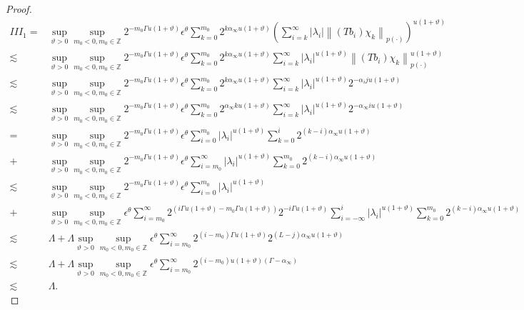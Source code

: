 \documentclass[oneside,reqno]{amsart}
\numberwithin{equation}{section}
\theoremstyle{definition}
\begin{document}
\begin{proof}
\begin{align*}
I I I_{1}= & \sup_{\vartheta>0 }\sup _{m_0<0, m_0\in  \mathbb{Z}} 2^{-m_0\Gamma u(1+\vartheta)} \epsilon  ^\theta \sum_{k=0}^{m_0} 2^{k  \alpha_{\infty}u(1+\vartheta)}\left(\sum_{i=k}^{\infty}\left|\lambda_{i}\right|\left\|\left(T b_{i}\right) \chi_{k}\right\|_{{p(\cdot)}}\right)^{u(1+\vartheta)} \\
\lesssim & \sup_{\vartheta>0 }\sup _{m_0<0, m_0\in  \mathbb{Z}} 2^{-m_0\Gamma u(1+\vartheta)} \epsilon  ^\theta \sum_{k=0}^{m_0} 2^{k\alpha_{\infty} u(1+\vartheta) } \sum_{i=k}^{\infty}\left|\lambda_{i}\right|^{u(1+\vartheta)}\left\|\left(T b_{i}\right) \chi_{k}\right\|_{{p(\cdot)}}^{u(1+\vartheta)} \\
\lesssim & \sup_{\vartheta>0 }\sup _{m_0<0, m_0\in  \mathbb{Z}} 2^{-m_0\Gamma u(1+\vartheta)} \epsilon  ^\theta \sum_{k=0}^{m_0} 2^{k\alpha_{\infty}u(1+\vartheta)  } \sum_{i=k}^{\infty}\left|\lambda_{i}\right|^{u(1+\vartheta)} 2^{-\alpha_{i}j  u(1+\vartheta)} \\
\lesssim & \sup_{\vartheta>0 }\sup _{m_0<0, m_0\in  \mathbb{Z}} 2^{-m_0\Gamma u(1+\vartheta)} \epsilon  ^\theta \sum_{k=0}^{m_0} 2^{\alpha_{\infty} k u(1+\vartheta)} \sum_{i=k}^{\infty}\left|\lambda_{i}\right|^{u(1+\vartheta)} 2^{-\alpha_{\infty} iu (1+\vartheta)} \\
= & \sup_{\vartheta>0 }\sup _{m_0<0, m_0\in  \mathbb{Z}} 2^{-m_0\Gamma u(1+\vartheta)} \epsilon  ^\theta \sum_{i=0}^{m_0}\left|\lambda_{i}\right|^{u(1+\vartheta)} \sum_{k=0}^{i} 2^{(k-i) \alpha_{\infty} u(1+\vartheta)} \\
+ & \sup_{\vartheta>0 }\sup _{m_0<0, m_0\in  \mathbb{Z}} 2^{-m_0\Gamma u(1+\vartheta)} \epsilon  ^\theta \sum_{i=m_0}^{\infty}\left|\lambda_{i}\right|^{u(1+\vartheta)} \sum_{k=0}^{m_0} 2^{(k-i) \alpha_{\infty} u(1+\vartheta)} \\
\lesssim & \sup_{\vartheta>0 }\sup _{m_0<0, m_0\in  \mathbb{Z}} 2^{-m_0\Gamma u(1+\vartheta)} \epsilon  ^\theta \sum_{i=0}^{m_0}\left|\lambda_{i}\right|^{u(1+\vartheta)} \\
+ &\sup_{\vartheta>0 }\sup _{m_0<0, m_0\in  \mathbb{Z}} \epsilon  ^\theta \sum_{i=m_0}^{\infty} 2^{(i\Gamma  u(1+\vartheta)-m_0\Gamma u(1+\vartheta))} 2^{-i\Gamma  u(1+\vartheta)} \sum_{i=-\infty}^{i}\left|\lambda_{i}\right|^{u(1+\vartheta)} \sum_{k=0}^{m_0} 2^{(k-i) \alpha_{\infty} u(1+\vartheta)} \\
\lesssim & \Lambda+\Lambda \sup_{\vartheta>0 }\sup _{m_0<0, m_0\in  \mathbb{Z}} \epsilon  ^\theta \sum_{i=m_0}^{\infty} 2^{(i-m_0) \Gamma u(1+\vartheta)} 2^{(L-j) \alpha_{\infty} u(1+\vartheta)} \\
\lesssim & \Lambda+\Lambda \sup_{\vartheta>0 }\sup _{m_0<0, m_0\in  \mathbb{Z}} \epsilon  ^\theta \sum_{i=m_0}^{\infty} 2^{(i-m_0) u(1+\vartheta)\left(\Gamma-\alpha_{\infty}\right)} \\
\lesssim & \Lambda .
\end{align*}



\end{proof}
\end{document}
